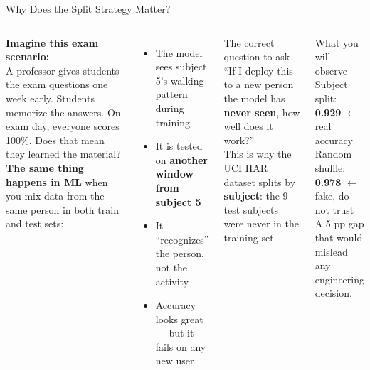 \documentclass[aspectratio=169,11pt]{beamer}
\begin{document}
\begin{frame}[shrink=5]{Why Does the Split Strategy Matter?}
    \begin{columns}
        \textbf{Imagine this exam scenario:}\\[4pt]
        A professor gives students the exam questions one week early. Students memorize the answers. On exam day, everyone scores 100\%. Does that mean they learned the material?\\[8pt]
        \textbf{The same thing happens in ML} when you mix data from the same person in both train and test sets:
        \begin{itemize}
            \item The model sees subject 5's walking pattern during training
            \item It is tested on \textbf{another window from subject 5}
            \item It ``recognizes'' the person, not the activity
            \item Accuracy looks great --- but it fails on any new user
        \end{itemize}

        \begin{alertblock}{The correct question to ask}
            ``If I deploy this to a new person the model has \textbf{never seen}, how well does it work?''\\[4pt]
            This is why the UCI HAR dataset splits by \textbf{subject}: the 9 test subjects were never in the training set.
        \end{alertblock}

        \vspace{0.2cm}
        \begin{exampleblock}{What you will observe}
            Subject split: \textbf{0.929} $\leftarrow$ real accuracy\\[2pt]
            Random shuffle: \textbf{0.978} $\leftarrow$ fake, do not trust\\[4pt]
            A 5 pp gap that would mislead any engineering decision.
        \end{exampleblock}
    \end{columns}
\end{frame}
\end{document}
